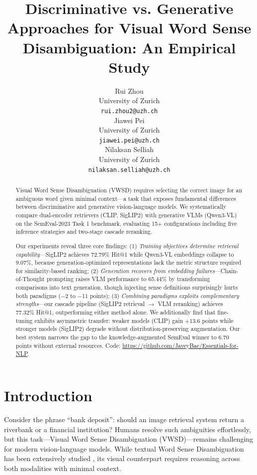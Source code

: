 \documentclass[11pt]{article}
\title{Discriminative vs. Generative Approaches for Visual Word Sense Disambiguation: An Empirical Study}
\author{Rui Zhou \\
  University of Zurich\\
  \texttt{rui.zhou2@uzh.ch} \\\And
  Jiawei Pei \\
  University of Zurich\\
  \texttt{jiawei.pei@uzh.ch} \\\And
  Nilaksan Selliah \\
  University of Zurich\\
  \texttt{nilaksan.selliah@uzh.ch} \\}
\begin{document}
\maketitle
\begin{abstract}
Visual Word Sense Disambiguation (VWSD) requires selecting the correct image for an ambiguous word given minimal context---a task that exposes fundamental differences between discriminative and generative vision-language models. We systematically compare dual-encoder retrievers (CLIP, SigLIP2) with generative VLMs (Qwen3-VL) on the SemEval-2023 Task 1 benchmark, evaluating 15+ configurations including five inference strategies and two-stage cascade reranking.

Our experiments reveal three core findings: (1) \textit{Training objectives determine retrieval capability}---SigLIP2 achieves 72.79\% Hit@1 while Qwen3-VL embeddings collapse to 9.07\%, because generation-optimized representations lack the metric structure required for similarity-based ranking; (2) \textit{Generation recovers from embedding failures}---Chain-of-Thought prompting raises VLM performance to 65.44\% by transforming comparisons into text generation, though injecting sense definitions surprisingly hurts both paradigms ($-$2 to $-$11 points); (3) \textit{Combining paradigms exploits complementary strengths}---our cascade pipeline (SigLIP2 retrieval $\rightarrow$ VLM reranking) achieves 77.32\% Hit@1, outperforming either method alone. We additionally find that fine-tuning exhibits asymmetric transfer: weaker models (CLIP) gain +13.6 points while stronger models (SigLIP2) degrade without distribution-preserving augmentation. Our best system narrows the gap to the knowledge-augmented SemEval winner to 6.70 points without external resources. Code: \url{https://github.com/JaveyBae/Essentials-for-NLP}.
\end{abstract}

\section{Introduction}

Consider the phrase ``bank deposit'': should an image retrieval system return a riverbank or a financial institution? Humans resolve such ambiguities effortlessly, but this task---Visual Word Sense Disambiguation (VWSD)---remains challenging for modern vision-language models. While textual Word Sense Disambiguation has been extensively studied \cite{bevilacqua-etal-2021-recent}, its visual counterpart requires reasoning across both modalities with minimal context.
\end{document}
